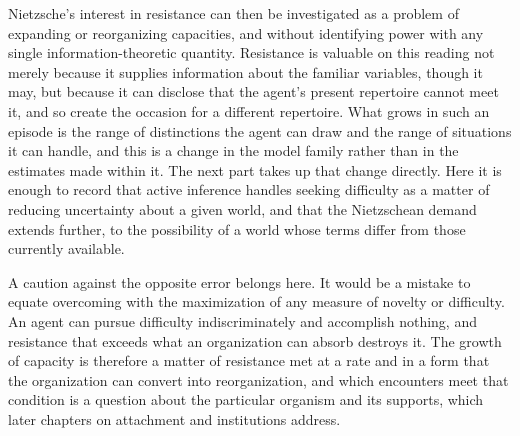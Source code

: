 Nietzsche's interest in resistance can then be investigated as a problem of expanding or reorganizing capacities, and without identifying power with any single information-theoretic quantity. Resistance is valuable on this reading not merely because it supplies information about the familiar variables, though it may, but because it can disclose that the agent's present repertoire cannot meet it, and so create the occasion for a different repertoire. What grows in such an episode is the range of distinctions the agent can draw and the range of situations it can handle, and this is a change in the model family rather than in the estimates made within it. The next part takes up that change directly. Here it is enough to record that active inference handles seeking difficulty as a matter of reducing uncertainty about a given world, and that the Nietzschean demand extends further, to the possibility of a world whose terms differ from those currently available.

A caution against the opposite error belongs here. It would be a mistake to equate overcoming with the maximization of any measure of novelty or difficulty. An agent can pursue difficulty indiscriminately and accomplish nothing, and resistance that exceeds what an organization can absorb destroys it. The growth of capacity is therefore a matter of resistance met at a rate and in a form that the organization can convert into reorganization, and which encounters meet that condition is a question about the particular organism and its supports, which later chapters on attachment and institutions address.
